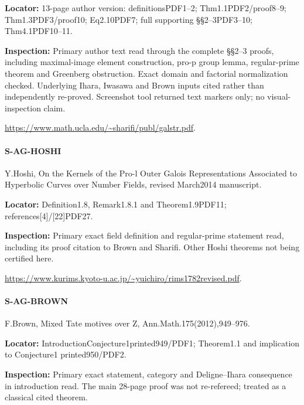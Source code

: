 \documentclass[11pt,a4paper]{article}
\begin{document}
\textbf{Locator:} 13-page author version:\allowbreak{} definitionsPDF1–\allowbreak{}2; Thm1.\allowbreak{}1PDF2/\allowbreak{}proof8–\allowbreak{}9; Thm1.\allowbreak{}3PDF3/\allowbreak{}proof10; Eq2.\allowbreak{}10PDF7; full supporting §§2–\allowbreak{}3PDF3–\allowbreak{}10; Thm4.\allowbreak{}1PDF10–\allowbreak{}11.

\textbf{Inspection:} Primary author text read through the complete §§2–\allowbreak{}3 proofs, including maximal-image element construction, pro-p group lemma, regular-prime theorem and Greenberg obstruction.\allowbreak{} Exact domain and factorial normalization checked.\allowbreak{} Underlying Ihara, Iwasawa and Brown inputs cited rather than independently re-proved.\allowbreak{} Screenshot tool returned text markers only; no visual-inspection claim.\allowbreak{}

\url{https://www.math.ucla.edu/~sharifi/publ/galstr.pdf}.

\paragraph{S-AG-HOSHI} Y.\allowbreak{}Hoshi, On the Kernels of the Pro-l Outer Galois Representations Associated to Hyperbolic Curves over Number Fields, revised March2014 manuscript.

\textbf{Locator:} Definition1.\allowbreak{}8, Remark1.\allowbreak{}8.\allowbreak{}1 and Theorem1.\allowbreak{}9PDF11; references[4]/\allowbreak{}[22]PDF27.

\textbf{Inspection:} Primary exact field definition and regular-prime statement read, including its proof citation to Brown and Sharifi.\allowbreak{} Other Hoshi theorems not being certified here.\allowbreak{}

\url{https://www.kurims.kyoto-u.ac.jp/~yuichiro/rims1782revised.pdf}.

\paragraph{S-AG-BROWN} F.\allowbreak{}Brown, Mixed Tate motives over Z, Ann.\allowbreak{}Math.\allowbreak{}175(2012),949–\allowbreak{}976.

\textbf{Locator:} IntroductionConjecture1printed949/\allowbreak{}PDF1; Theorem1.\allowbreak{}1 and implication to Conjecture1 printed950/\allowbreak{}PDF2.

\textbf{Inspection:} Primary exact statement, category and Deligne–\allowbreak{}Ihara consequence in introduction read.\allowbreak{} The main 28-page proof was not re-refereed; treated as a classical cited theorem.\allowbreak{}
\end{document}
